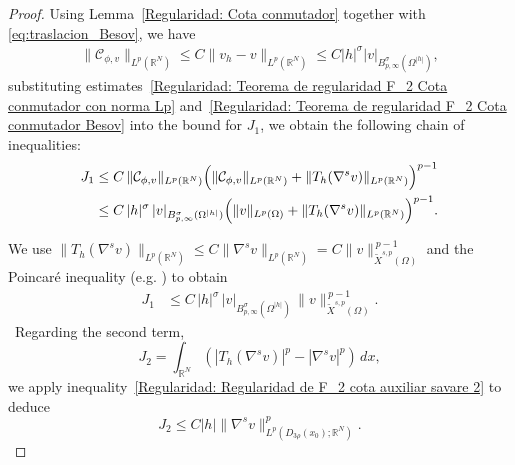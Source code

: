 \documentclass[]{amsart}
\theoremstyle{definition}
\theoremstyle{definition}
\theoremstyle{remark}
\numberwithin{equation}{section}
\newcommand{\grads}{\nabla^{s}}
\begin{document}
\begin{proof}
Using Lemma~\ref{Regularidad: Cota conmutador} together with \eqref{eq:traslacion_Besov},
we have
\begin{equation} \label{Regularidad: Teorema de regularidad F_2 Cota conmutador Besov}
\begin{aligned}
\|\mathcal{C}_{\phi,v}\|_{L^p(\mathbb{R}^N)} \leq C \| v_h-v \|_{L^{p}(\mathbb{R}^N)}  
	\leq C |h|^{\sigma} |v|_{B^{\sigma}_{p,\infty}(\Omega^{|h|})},
\end{aligned}    
\end{equation}
substituting estimates~\eqref{Regularidad: Teorema de regularidad F_2 Cota conmutador con norma Lp} and~\eqref{Regularidad: Teorema de regularidad F_2 Cota conmutador Besov} into the bound for \( J_1 \), we obtain the following chain of inequalities:
\[
\begin{aligned}
J_1 &\le C \,\|\mathcal{C}_{\phi,v}\|_{L^p(\mathbb{R}^N)}
\Bigl(\|\mathcal{C}_{\phi,v}\|_{L^p(\mathbb{R}^N)} + \|T_h(\nabla^s v)\|_{L^p(\mathbb{R}^N)}\Bigr)^{p-1}\\
&\le C\,|h|^{\sigma}\,|v|_{B^{\sigma}_{p,\infty}(\Omega^{|h|})}
\Bigl(\|v\|_{L^{p}(\Omega)} + \|T_h(\nabla^s v)\|_{L^p(\mathbb{R}^N)}\Bigr)^{p-1}.
\end{aligned}
\]

We use $ \|T_h(\nabla^s v)\|_{L^p(\mathbb{R}^N)} \le C  \|\nabla^s v\|_{L^p(\mathbb{R}^N)} = C \|v\|^{\,p-1}_{\widetilde{X}^{s,p}(\Omega)}$ and the Poincar\'e inequality (e.g. \cite[Theorem 2.9]{bellido2020gammaconvergencepolyconvexfunctionalsinvolving})
to obtain
\begin{align*}
    J_1 
        &\leq C\, |h|^{\sigma} \, |v|_{B^{\sigma}_{p,\infty}(\Omega^{|h|})} \, \|v\|^{\,p-1}_{\widetilde{X}^{s,p}(\Omega)}.
\end{align*}
\
Regarding the second term,
\[
J_2 = \int_{\mathbb{R}^N} \left( \left|T_h(\grads v)\right|^p - \left|\grads v\right|^p\right) \, dx,
\]
we apply inequality~\eqref{Regularidad: Regularidad de F_2 cota auxiliar savare 2} to deduce
\[
J_2 \leq C|h|\|\grads v\|^p_{L^p(D_{3\rho}(x_0);\mathbb{R}^N)}.
\]


\end{proof}
\end{document}
